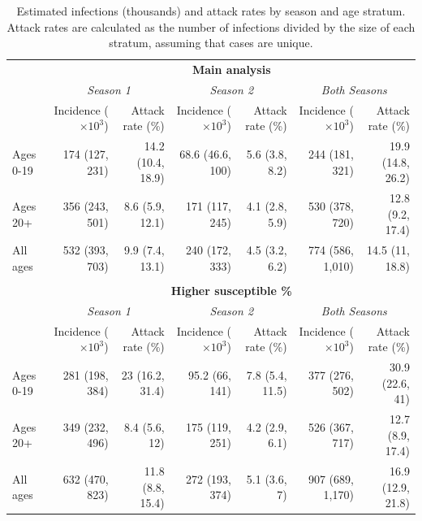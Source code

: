 \begin{table}
	\caption[Estimated A(H1N1) infections and attack rates by season and age stratum.]{Estimated infections (thousands) and attack rates by season and age stratum. Attack rates are calculated as the number of infections divided by the size of each stratum, assuming that cases are unique.}
	\label{tab:flu_attack_rates_sensitivity}
	\centering\footnotesize
	\begin{tabular}{lrrrrrr}
		\hline
		&\multicolumn{6}{c}{\textbf{Main analysis}}\\
		\cmidrule{2-7} & \multicolumn{2}{c}{\textit{Season 1}} & \multicolumn{2}{c}{\textit{Season 2}} & \multicolumn{2}{c}{\textit{Both Seasons}}\\
		\cmidrule(r){2-3}\cmidrule(lr){4-5}\cmidrule(l){6-7} & 
		Incidence ($ \times10^3 $) & Attack rate (\%) & Incidence ($ \times10^3 $)& Attack rate (\%) & Incidence ($ \times10^3 $) & Attack rate (\%)\\
		\hline
		Ages 0-19 & 174 (127, 231) & 14.2 (10.4, 18.9) & 68.6 (46.6, 100) & 5.6 (3.8, 8.2) & 244 (181, 321) & 19.9 (14.8, 26.2)\\
		Ages 20+ & 356 (243, 501) & 8.6 (5.9, 12.1) & 171 (117, 245) & 4.1 (2.8, 5.9) & 530 (378, 720) & 12.8 (9.2, 17.4)\\
		All ages & 532 (393, 703) & 9.9 (7.4, 13.1) & 240 (172, 333) & 4.5 (3.2, 6.2) & 774 (586, 1,010) & 14.5 (11, 18.8)\\
		\hline &&&&&&\\
		&\multicolumn{6}{c}{\textbf{Higher susceptible \%}}\\
		\cmidrule{2-7}	& \multicolumn{2}{c}{\textit{Season 1}} & \multicolumn{2}{c}{\textit{Season 2}} & \multicolumn{2}{c}{\textit{Both Seasons}}\\
		\cmidrule(r){2-3}\cmidrule(lr){4-5}\cmidrule(l){6-7} & 
		Incidence ($ \times10^3 $) & Attack rate (\%)& Incidence ($ \times10^3 $) & Attack rate (\%)& Incidence ($ \times10^3 $) & Attack rate (\%)\\
		\hline
		Ages 0-19 & 281 (198, 384) & 23 (16.2, 31.4) & 95.2 (66, 141) & 7.8 (5.4, 11.5) & 377 (276, 502) & 30.9 (22.6, 41)\\
		Ages 20+ & 349 (232, 496) & 8.4 (5.6, 12) & 175 (119, 251) & 4.2 (2.9, 6.1) & 526 (367, 717) & 12.7 (8.9, 17.4)\\
		All ages & 632 (470, 823) & 11.8 (8.8, 15.4) & 272 (193, 374) & 5.1 (3.6, 7) & 907 (689, 1,170) & 16.9 (12.9, 21.8)\\
		\hline
	\end{tabular}
\end{table}


